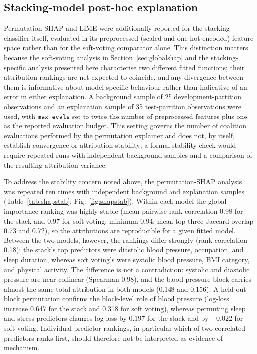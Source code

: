 \documentclass[a4paper,fleqn]{cas-dc}
\begin{document}
\subsection{Stacking-model post-hoc explanation}
\label{sec:stackpost}
Permutation SHAP and LIME were additionally reported for the stacking classifier itself, evaluated in its preprocessed (scaled and one-hot encoded) feature space rather than for the soft-voting comparator alone. This distinction matters because the soft-voting analysis in Section~\ref{sec:globalshap} and the stacking-specific analysis presented here characterise two different fitted functions; their attribution rankings are not expected to coincide, and any divergence between them is informative about model-specific behaviour rather than indicative of an error in either explanation. A background sample of 25 development-partition observations and an explanation sample of 35 test-partition observations were used, with \texttt{max\_evals} set to twice the number of preprocessed features plus one as the reported evaluation budget. This setting governs the number of coalition evaluations performed by the permutation explainer and does not, by itself, establish convergence or attribution stability; a formal stability check would require repeated runs with independent background samples and a comparison of the resulting attribution variance.

To address the stability concern noted above, the permutation-SHAP analysis was repeated ten times with independent background and explanation samples (Table~\ref{tab:shapstab}; Fig.~\ref{fig:shapstab}). Within each model the global importance ranking was highly stable (mean pairwise rank correlation 0.98 for the stack and 0.97 for soft voting; minimum 0.94; mean top-three Jaccard overlap 0.73 and 0.72), so the attributions are reproducible for a given fitted model. Between the two models, however, the rankings differ strongly (rank correlation 0.18): the stack's top predictors were diastolic blood pressure, occupation, and sleep duration, whereas soft voting's were systolic blood pressure, BMI category, and physical activity. The difference is not a contradiction: systolic and diastolic pressure are near-collinear (Spearman 0.98), and the blood-pressure block carries almost the same total attribution in both models (0.148 and 0.156). A held-out block permutation confirms the block-level role of blood pressure (log-loss increase 0.647 for the stack and 0.318 for soft voting), whereas permuting sleep and stress predictors changes log-loss by 0.197 for the stack and by $-0.022$ for soft voting. Individual-predictor rankings, in particular which of two correlated predictors ranks first, should therefore not be interpreted as evidence of mechanism.
\end{document}
